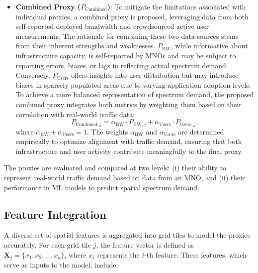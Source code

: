 \documentclass[conference]{IEEEtran}
\begin{document}
\begin{itemize}
    \item \textbf{Combined Proxy (\(P_{\text{Combined}}\))}: To mitigate the limitations associated with individual proxies, a combined proxy is proposed, leveraging data from both self-reported deployed bandwidth and crowdsourced active user measurements. The rationale for combining these two data sources stems from their inherent strengths and weaknesses. \(P_{\text{BW}}\), while informative about infrastructure capacity, is self-reported by MNOs and may be subject to reporting errors, biases, or lags in reflecting actual spectrum demand. Conversely, \(P_{\text{Users}}\) offers insights into user distribution but may introduce biases in sparsely populated areas due to varying application adoption levels. To achieve a more balanced representation of spectrum demand, the proposed combined proxy integrates both metrics by weighting them based on their correlation with real-world traffic data:
    \begin{equation}
        P_{\text{Combined}, j} = \alpha_{\text{BW}} \cdot P_{\text{BW}, j} + \alpha_{\text{Users}} \cdot P_{\text{Users}, j},
    \end{equation}
    where \(\alpha_{\text{BW}} + \alpha_{\text{Users}} = 1\). The weights \(\alpha_{\text{BW}}\) and \(\alpha_{\text{Users}}\) are determined empirically to optimize alignment with traffic demand, ensuring that both infrastructure and user activity contribute meaningfully to the final proxy. 
    \end{itemize}

The proxies are evaluated and compared at two levels: (i) their ability to represent real-world traffic demand based on data from an MNO, and (ii) their performance in ML models to predict spatial spectrum demand.

\subsection{Feature Integration}

A diverse set of spatial features is aggregated into grid tiles to model the proxies accurately. For each grid tile \( j \), the feature vector is defined as \( \mathbf{X}_j = \{ x_1, x_2, \dots, x_k \} \), where \( x_i \) represents the \( i \)-th feature. These features, which serve as inputs to the model, include:
\end{document}
